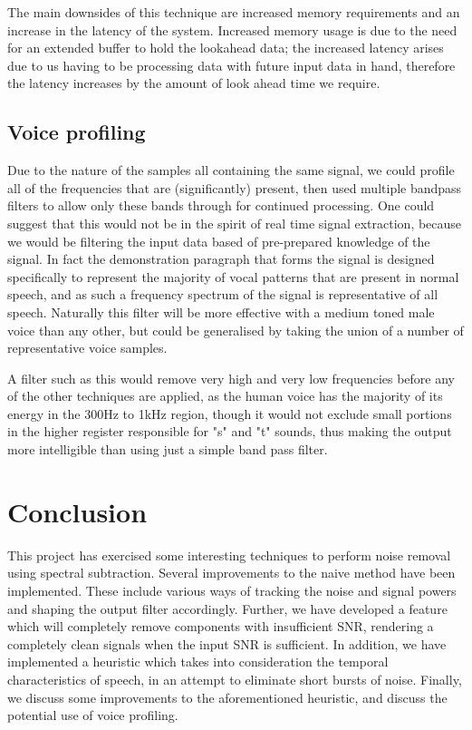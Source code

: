 \documentclass[11pt]{article} %
\begin{document}
{The main downsides of this technique are increased memory requirements and an increase in the latency of the system. Increased memory usage is due to the need for an extended buffer to hold the lookahead data; the increased latency arises due to us having to be processing data with future input data in hand, therefore the latency increases by the amount of look ahead time we require. 

\subsection{Voice profiling}
Due to the nature of the samples all containing the same signal, we could profile all of the frequencies that are (significantly) present, then used multiple bandpass filters to allow only these bands through for continued processing. One could suggest that this would not be in the spirit of real time signal extraction, because we would be filtering the input data based of pre-prepared knowledge of the signal. In fact the demonstration paragraph that forms the signal is designed specifically to represent the majority of vocal patterns that are present in normal speech, and as such a frequency spectrum of the signal is representative of all speech. Naturally this filter will be more effective with a medium toned male voice than any other, but could be generalised by taking the union of a number of representative voice samples. 

A filter such as this would remove very high and very low frequencies before any of the other techniques are applied, as the human voice has the majority of its energy in the 300Hz to 1kHz region, though it would not exclude small portions in the higher register responsible for "s" and "t" sounds, thus making the output more intelligible than using just a simple band pass filter.

\section{Conclusion}

This project has exercised some interesting techniques to perform noise removal using spectral subtraction. Several improvements to the naive method have been implemented. These include various ways of tracking the noise and signal powers and shaping the output filter accordingly. Further, we have developed a feature which will completely remove components with insufficient SNR, rendering a completely clean signals when the input SNR is sufficient. In addition, we have implemented a heuristic which takes into consideration the temporal characteristics of speech, in an attempt to eliminate short bursts of noise. Finally, we discuss some improvements to the aforementioned heuristic, and discuss the potential use of voice profiling.

}
\end{document}
